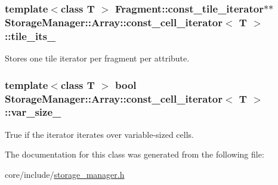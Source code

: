 \subsubsection[{tile\+\_\+its\+\_\+}]{\setlength{\rightskip}{0pt plus 5cm}template$<$class T $>$ {\bf Fragment\+::const\+\_\+tile\+\_\+iterator}$\ast$$\ast$ {\bf Storage\+Manager\+::\+Array\+::const\+\_\+cell\+\_\+iterator}$<$ T $>$\+::tile\+\_\+its\+\_\+\hspace{0.3cm}{\ttfamily [private]}}\label{classStorageManager_1_1Array_1_1const__cell__iterator_a4c30f02f9ff4e4fdccc729df11658e42}
Stores one tile iterator per fragment per attribute. \hypertarget{classStorageManager_1_1Array_1_1const__cell__iterator_a371fbfd3a46cdbb3891c3ec64853e93b}{}
\subsubsection[{var\+\_\+size\+\_\+}]{\setlength{\rightskip}{0pt plus 5cm}template$<$class T $>$ bool {\bf Storage\+Manager\+::\+Array\+::const\+\_\+cell\+\_\+iterator}$<$ T $>$\+::var\+\_\+size\+\_\+\hspace{0.3cm}{\ttfamily [private]}}\label{classStorageManager_1_1Array_1_1const__cell__iterator_a371fbfd3a46cdbb3891c3ec64853e93b}
True if the iterator iterates over variable-\/sized cells. 

The documentation for this class was generated from the following file\+:\begin{DoxyCompactItemize}
\item 
core/include/\hyperlink{storage__manager_8h}{storage\+\_\+manager.\+h}\end{DoxyCompactItemize}
